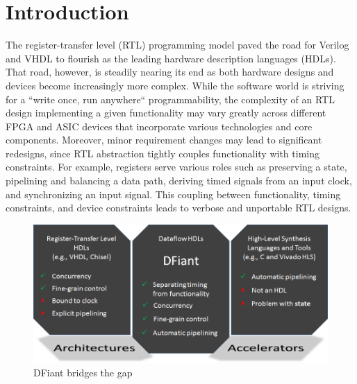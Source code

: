 \section{Introduction}
The register-transfer level (RTL) programming model paved the road for Verilog and VHDL to flourish as the leading hardware description languages (HDLs). That road, however, is steadily nearing its end as both hardware designs and devices become increasingly more complex. While the software world is striving for a ``write once, run anywhere`` programmability, the complexity of an RTL design implementing a given functionality may vary greatly across different FPGA and ASIC devices that incorporate various technologies and core components. Moreover, minor requirement changes may lead to significant redesigns, since RTL abstraction tightly couples functionality with timing constraints. For example, registers serve various roles such as preserving a state, pipelining and balancing a data path, deriving timed signals from an input clock, and synchronizing an input signal. This coupling between functionality, timing constraints, and device constraints leads to verbose and unportable RTL designs. 

\begin{figure}[h]
	\includegraphics[width=\linewidth]{graphics/teaser}
	\caption{DFiant bridges the gap}
	\label{fig:teaser}
\end{figure}

